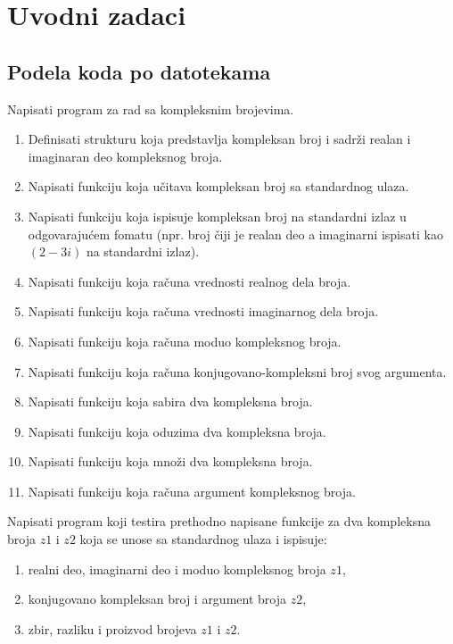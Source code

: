 \chapter{Uvodni zadaci}

\section{Podela koda po datotekama}

\begin{Exercise}[label=001] %
Napisati program za rad sa kompleksnim brojevima.
\begin{enumerate}
\item Definisati strukturu  koja predstavlja kompleksan broj i sadrži realan i imaginaran deo kompleksnog broja.
\item Napisati funkciju  koja učitava kompleksan broj sa standardnog ulaza.
\item Napisati funkciju  koja ispisuje kompleksan broj na standardni izlaz u odgovarajućem fomatu (npr. broj čiji je realan deo  a imaginarni  ispisati kao $(2 - 3 i)$ na standardni izlaz).
\item Napisati funkciju  koja računa vrednosti realnog dela broja.
\item Napisati funkciju  koja računa vrednosti imaginarnog dela broja.
\item Napisati funkciju  koja računa moduo kompleksnog broja.
\item Napisati funkciju  koja računa konjugovano-kompleksni broj svog argumenta.
\item Napisati funkciju  koja sabira dva kompleksna broja.
\item Napisati funkciju  koja oduzima dva kompleksna broja.
\item Napisati funkciju  koja množi dva kompleksna broja.
\item Napisati funkciju  koja računa argument kompleksnog broja.
\end{enumerate}
Napisati program koji testira prethodno napisane funkcije za dva kompleksna broja $z1$ i $z2$ koja se unose sa standardnog ulaza i ispisuje:
\begin{enumerate}
\item realni deo, imaginarni deo i moduo kompleksnog broja $z1$,
\item konjugovano kompleksan broj i argument broja $z2$,
\item zbir, razliku i proizvod brojeva $z1$ i $z2$.
\end{enumerate}


\end{Exercise}
